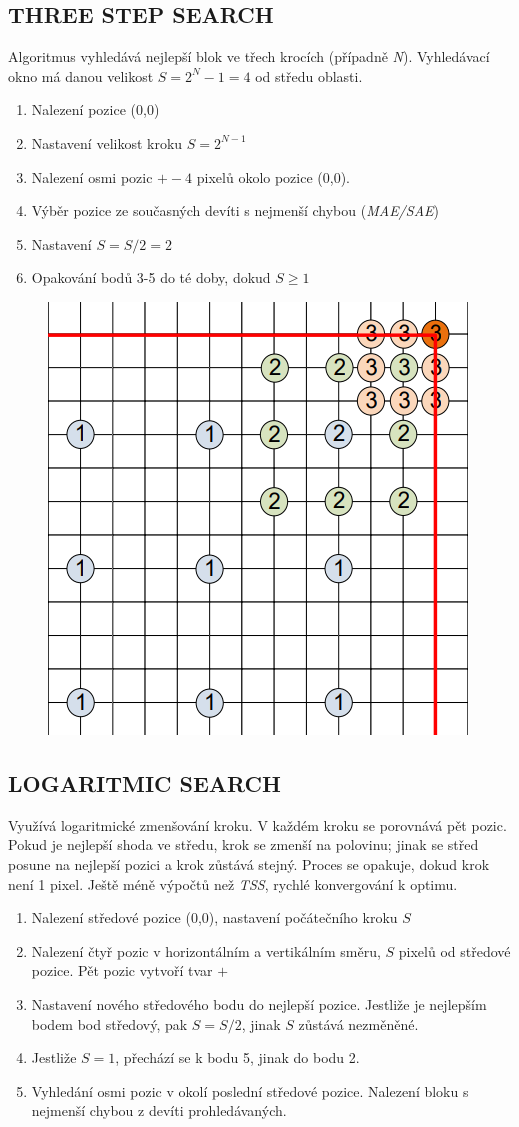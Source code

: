 \subsection{THREE STEP SEARCH}

Algoritmus vyhledává nejlepší blok ve třech krocích (případně \textit{N}). Vyhledávací
okno má danou velikost $S=2^{N}-1=4$ od středu oblasti.

\begin{enumerate}
    \item Nalezení pozice (0,0)
    \item Nastavení velikost kroku $S=2^{N-1}$
    \item Nalezení osmi pozic $+-4$ pixelů okolo pozice (0,0).
    \item Výběr pozice ze současných devíti s nejmenší chybou (\textit{MAE/SAE})
    \item Nastavení $S=S/2=2$
    \item Opakování bodů 3-5 do té doby, dokud $S\geq1$    
\end{enumerate}

\begin{figure}[ht]
    \centering
    \includegraphics[width=0.3\linewidth]{MPC-ZMD//images/tree.png}
\end{figure}
\FloatBarrier

\subsection{LOGARITMIC SEARCH}

Využívá logaritmické zmenšování kroku. V každém kroku se porovnává pět pozic. Pokud je nejlepší shoda ve středu, krok se zmenší na polovinu; jinak se střed posune na nejlepší pozici a krok zůstává stejný. Proces se opakuje, dokud krok není 1 pixel. Ještě méně výpočtů než \textit{TSS}, rychlé konvergování k optimu.

\begin{enumerate}
    \item Nalezení středové pozice (0,0), nastavení počátečního kroku $S$
    \item Nalezení čtyř pozic v horizontálním a vertikálním směru, $S$ pixelů od středové pozice. Pět pozic vytvoří tvar $+$
    \item Nastavení nového středového bodu do nejlepší pozice. Jestliže je nejlepším bodem bod středový, pak $S=S/2$, jinak $S$ zůstává nezměněné.
    \item Jestliže $S=1$, přechází se k bodu 5, jinak do bodu 2.
    \item Vyhledání osmi pozic v okolí poslední středové pozice. Nalezení bloku s nejmenší chybou z devíti prohledávaných.
\end{enumerate}


